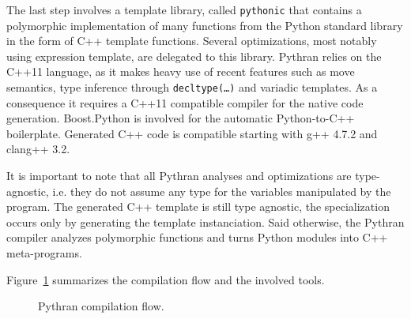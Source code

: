 \documentclass[10pt, onecolumn, preprint]{sigplanconf}
\begin{document}
The last step involves a template library, called \texttt{pythonic} that 
contains a polymorphic implementation of many functions from the Python standard
library in the form of C++ template functions. Several optimizations, most
notably using expression template, are delegated to this library. Pythran relies
on the C++11\cite{isocxx11} language, as it makes heavy use of recent features 
such as move semantics, type inference through \texttt{decltype(\dots)} and 
variadic templates.
As a consequence it requires a C++11 compatible compiler for the native code
generation. Boost.Python\cite{boostpython2007} is involved for the automatic
Python-to-C++ boilerplate. Generated C++ code is compatible starting with g++ 
4.7.2 and clang++ 3.2.

It is important to note that all Pythran analyses and optimizations are
type-agnostic, i.e. they do not assume any type for the variables manipulated
by the program. The generated C++ template is still type agnostic, the specialization occurs only by generating the template instanciation.
Said otherwise, the Pythran compiler analyzes polymorphic functions and turns
Python modules into C++ meta-programs.

Figure~\ref{fig:pythran-compiler} summarizes the compilation flow and the 
involved tools.

\begin{figure}

    \centering
    
    \caption{Pythran compilation flow.}
    \label{fig:pythran-compiler}

\end{figure}
\end{document}
